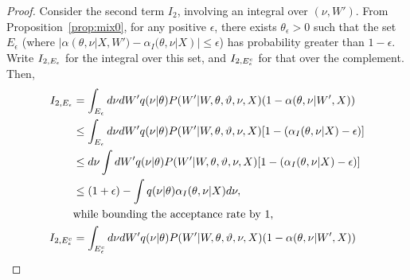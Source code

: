 \begin{proof}
{Consider the second term $I_2$, involving an integral over $(\nu,W')$.
  From Proposition~\ref{prop:mix0}, for any positive $\epsilon$, there
  exists $\theta_\epsilon > 0$ such that the set $E_{\epsilon}$
  (where $|\alpha(\theta, \nu | X,W') - \alpha_I(\theta, \nu | X)| \le
  \epsilon$) has probability greater than $1-\epsilon$.
  Write $I_{2,E_{\epsilon}}$ for the integral over this set, and
  $I_{2,E_{\epsilon}^c}$ for that over the complement. Then,
}
\begin{align*}
I_{2,\E_{\epsilon}} &= \int_{\E_{\epsilon}} d\nu  dW'q(\nu | \theta)P(W' | W, \theta, \vartheta, \nu, X)(1 - \alpha(\theta, \nu | W', X)) \\
&\le \int_{\E_\epsilon}d\nu dW' q(\nu | \theta)
  P(W' | W, \theta, \vartheta, \nu, X)  [ 1 - (\alpha_I(\theta, \nu | X)-\epsilon)] \\
&\le d\nu \int dW'  q(\nu | \theta)
  P(W' | W, \theta, \vartheta, \nu, X)
  [ 1 - (\alpha_I(\theta, \nu | X)-\epsilon)] \\
  &\le (1+\epsilon)  - \int  q(\nu | \theta) \alpha_I(\theta, \nu | X) d\nu, \\
 & \text{while bounding the acceptance rate by 1,} \\
  I_{2,\E_{\epsilon}^c}  &= \int_{\E^c_{\epsilon}} d\nu  dW'q(\nu | \theta)P(W' | W, \theta, \vartheta, \nu, X)(1 - \alpha(\theta, \nu | W', X)) \\

\end{align*}
\end{proof}
